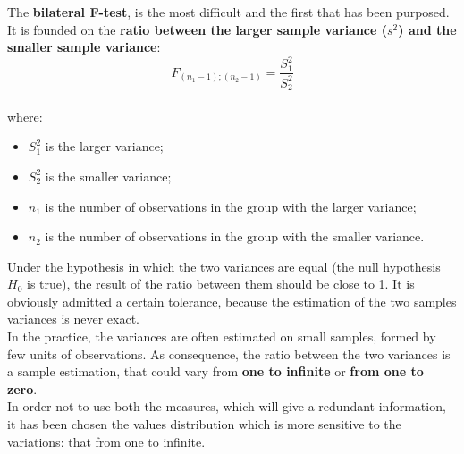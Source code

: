 \begin{frame}
  \vspace*{.25cm}
  The \textbf{bilateral F-test}, is the most difficult and the first that has been purposed. It is founded on the \textbf{ratio between the larger sample variance ({\boldmath $ s^2 $}) and the smaller sample variance}:\\
  \vspace*{.25cm}
  $$ F_{(n_1-1);(n_2-1)} = \frac{S^2_1}{S^2_2} $$\\
  \vspace*{.25cm}
  where:
  \vspace*{.25cm}
  \begin{itemize}
    \item $ S^2_1 $ is the larger variance;
    \item $ S^2_2 $ is the smaller variance;
    \item $ n_1 $ is the number of observations in the group with the larger variance;
    \item $ n_2 $ is the number of observations in the group with the smaller variance.
  \end{itemize}
\end{frame}

\begin{frame}
  \vspace*{.25cm}
  Under the hypothesis in which the two variances are equal (the null hypothesis $H_0$ is true), the result of the ratio between them should be close to 1. It is obviously admitted a certain tolerance, because the estimation of the two samples variances is never exact.\\
  \vspace*{.25cm}
  In the practice, the variances are often estimated on small samples, formed by few units of observations. As consequence, the ratio between the two variances is a sample estimation, that could vary from \textbf{one to infinite} or \textbf{from one to zero}.\\
  \vspace*{.25cm}
  In order not to use both the measures, which will give a redundant information, it has been chosen the values distribution which is more sensitive to the variations: that from one to infinite.
\end{frame}

